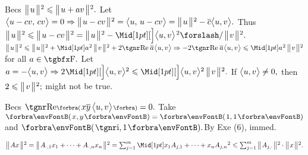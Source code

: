 Becs $\big\Vert\hspace{1pt}{}u{}\hspace{1pt}\big\Vert{\hspace{0.5pt}}{^2}\leqslant\big\Vert\hspace{1pt}{}u+av{}\hspace{1pt}\big\Vert{\hspace{0.5pt}}{^2}.$ Let $\big\langle{}u-cv,\,cv{}\big\rangle=0\Rightarrow\big\Vert\hspace{1pt}{}u-cv{}\hspace{1pt}\big\Vert{\hspace{0.5pt}}{^2}=\big\langle{}u,\,u-cv{}\big\rangle=\big\Vert\hspace{1pt}{}u{}\hspace{1pt}\big\Vert{\hspace{0.5pt}}{^2}-\overline{c}\big\langle{}u,v{}\big\rangle.$\parSol{}
Thus $\Dvertsq{u}\leqslant\Dvertsq{u-cv}=\Dvertsq{u}-\innerAsq{u,v}{\;\!\XSlash\;\!}\Dvertsq{v}.$\PfEnd\vspace{4pt}\parSol{}
\Or $\Dvertsq{u}\leqslant\Dvertsq{u}+\aMidsq{a}\,\Dvertsq{v}+2\REAL\:\overline{a}\:\!\Ang{u,v}\Rightarrow-2\REAL\:\overline{a}\:\!\Ang{u,v}\leqslant\aMidsq{a}\,\Dvertsq{v}$ for all $a\in\Fbb.$\parSol{}
Let $a=-\Ang{u,v}\Rightarrow2\:\!\innerA{u,v}{^2}\leqslant\innerA{u,v}{^2}\,\Dvertsq{v}.$ If $\big\langle{}u,v{}\big\rangle\neq0,$ then $2\leqslant\big\Vert\hspace{1pt}{}v{}\hspace{1pt}\big\Vert{\hspace{0.5pt}}{^2};$ might not be true.\PfEnd
\SepLine

Becs $\REAL\BigPar{x\overline{y}\,\Ang{u,v}}=0.$ Take $\Par{x,y}=\Par{1,1}$ and $\Par{\i,1}.$\quad\Or By Exe (6), immed.\PfEnd
\SepLine


$\Dvertsq{Ax}=\Dvertsq{A_{\cdot,1}x_1+\dots+A_{\cdot,n}x_n}=\sum_{j=1}^m\aMidsq{x_1A_{j,1}+\dots+x_nA_{j,n}}\leqslant\sum_{j=1}^m\Dvertsq{A_{j,\cdot}}\cdot\Dvertsq{x}.$\PfEnd
\SepLine

